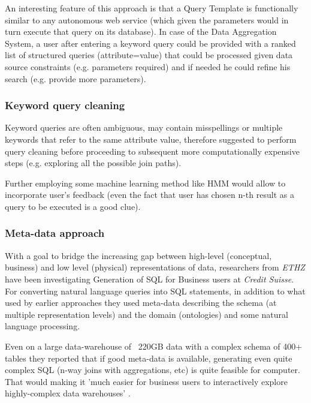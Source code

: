 An interesting feature of this approach is that a Query Template is functionally similar to any autonomous web service (which given the parameters would in turn execute that query on its database).  In case of the Data Aggregation System, a user after entering a keyword query could be provided with a ranked list of structured queries (attribute=value) that could be processed given data source constraints (e.g. parameters required) and if needed he could refine his search (e.g. provide more parameters).


\subsubsection*{Keyword query cleaning}
Keyword queries are often ambiguous, may contain misspellings or multiple keywords that refer to the same attribute value,  therefore \cite{kw_cleaning} suggested to perform query cleaning before proceeding to subsequent more computationally expensive steps (e.g. exploring all the possible join paths).

Further employing some machine learning method like HMM\cite{kw_cleaning_hmm} would allow to incorporate user's feedback (even the fact that user has chosen n-th result as a query to be executed is a good clue).


\subsubsection*{Meta-data approach}

With a goal to bridge the increasing gap between high-level (conceptual, business) and low level (physical) representations of data, researchers from \textit{ETHZ} have been investigating Generation of SQL for Business users at \textit{Credit Suisse}.  For converting natural language queries 
 into SQL statements, in addition to what used by earlier approaches they used meta-data describing the schema (at multiple representation levels) and the domain (ontologies) and some natural language processing.

Even on a large data-warehouse of ~220GB data with a complex schema of 400+ tables they reported that if good meta-data is available, generating even quite complex SQL  (n-way joins with aggregations, etc) is quite feasible for computer. That would making it 'much easier for business users to interactively explore highly-complex data warehouses' \cite[p.932]{ethz2012}. 




